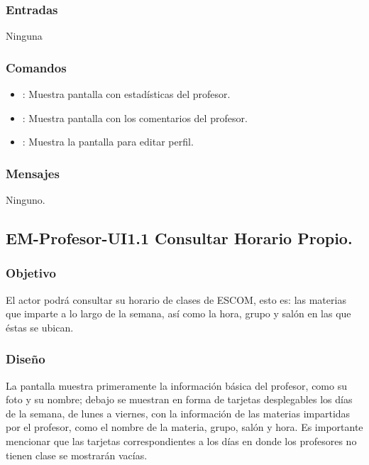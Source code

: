 \subsubsection{Entradas}
	\noindent
	Ninguna

\subsubsection{Comandos}
	\begin{itemize}
		\item {}: Muestra pantalla con estadísticas del profesor.
		\item {}: Muestra pantalla con los comentarios del profesor.
		\item {}: Muestra la pantalla para editar perfil.
	\end{itemize}

\subsubsection{Mensajes}
	\noindent
	Ninguno.


\subsection{EM-Profesor-UI1.1 Consultar Horario Propio.}

\subsubsection{Objetivo}
	\noindent
	El actor podrá consultar su horario de clases de ESCOM, esto es: las materias que imparte a lo largo de la semana, así como la hora, grupo y salón en las que éstas se ubican.


\subsubsection{Diseño}
	\noindent
	La pantalla muestra primeramente la información básica del profesor, como su foto y su nombre; debajo se muestran en forma de tarjetas desplegables los días de la semana, de lunes a viernes, con la información de las materias impartidas por el profesor, como el nombre de la materia, grupo, salón y hora. Es importante mencionar que las tarjetas correspondientes a los días en donde los profesores no tienen clase se mostrarán vacías.

